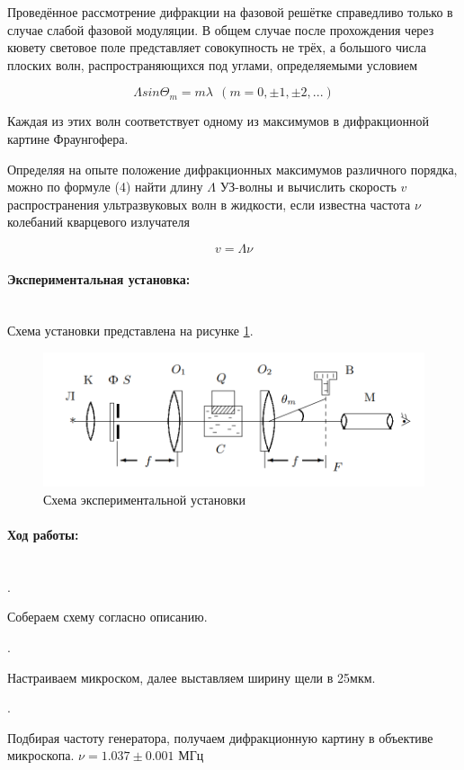 \documentclass[a4paper, 12pt]{article}
\newcommand{\parag}[1]{\paragraph*{#1:}}
\newcounter{Points}
\newcommand{\point}{\arabic{Points}. \addtocounter{Points}{1}}
\begin{document}
\par Проведённое рассмотрение дифракции на фазовой решётке справедливо 
только в случае слабой фазовой модуляции. В общем случае после прохождения
через кювету световое поле представляет совокупность не трёх, а 
большого числа плоских волн, распространяющихся под углами, 
определяемыми условием

\begin{equation*}
    \Lambda sin\Theta_m = m\lambda~~(m = 0, \pm1, \pm2,...)
\end{equation*}

\par Каждая из этих волн соответствует одному из максимумов в 
дифракционной картине Фраунгофера.
\par Определяя на опыте положение дифракционных максимумов различного 
порядка, можно по формуле (4) найти длину $\Lambda$ УЗ-волны и вычислить
скорость $v$ распространения ультразвуковых волн в жидкости, если 
известна частота $\nu$ колебаний кварцевого излучателя

\begin{equation*}
    v = \Lambda \nu
\end{equation*}

\parag {Экспериментальная установка}~\\
Схема установки представлена на рисунке \ref{pic:setup}.

\begin{figure}[h]
    \centering
    \includegraphics[scale = 0.6]{setup.png}
    \caption{Схема экспериментальной установки}
    \label{pic:setup}
\end{figure}

\parag {Ход работы} ~\\
\point Собераем схему согласно описанию.

\point Настраиваем микроском, далее выставляем ширину щели в 25мкм.

\point Подбирая частоту генератора, получаем дифракционную картину
в объективе микроскопа. $\nu = 1.037 \pm 0.001$ МГц
\end{document}
